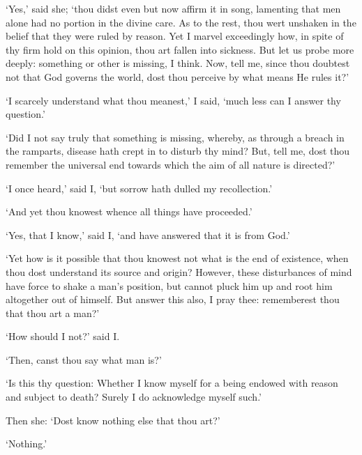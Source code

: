 \documentclass[11pt]{book}
\begin{document}
`Yes,' said she; `thou didst even but now affirm it in song, lamenting
that men alone had no portion in the divine care. As to the rest, thou
wert unshaken in the belief that they were ruled by reason. Yet I
marvel exceedingly how, in spite of thy firm hold on this opinion, thou
art fallen into sickness. But let us probe more deeply: something or
other is missing, I think. Now, tell me, since thou doubtest not that
God governs the world, dost thou perceive by what means He rules it?'

`I scarcely understand what thou meanest,' I said, `much less can I
answer thy question.'

`Did I not say truly that something is missing, where\-by, as through a
breach in the ramparts, disease hath crept in to disturb thy mind? But,
tell me, dost thou remember the universal end towards which the aim of
all nature is directed?'

`I once heard,' said I, `but sorrow hath dulled my recollection.'

`And yet thou knowest whence all things have proceeded.'

`Yes, that I know,' said I, `and have answered that it is from God.'

`Yet how is it possible that thou knowest not what is the end of
existence, when thou dost understand its source and origin? However,
these disturbances of mind have force to shake a man's position, but
cannot pluck him up and root him altogether out of himself. But answer
this also, I pray thee: rememberest thou that thou art a man?'

`How should I not?' said I.

`Then, canst thou say what man is?'

`Is this thy question: Whether I know myself for a being endowed with
reason and subject to death? Surely I do acknowledge myself such.'

Then she: `Dost know nothing else that thou art?'

`Nothing.'
\end{document}
